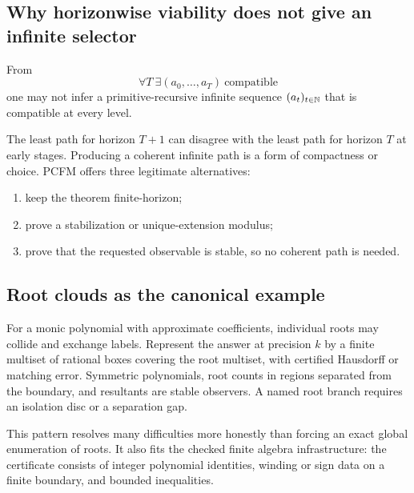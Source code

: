 \subsection{Why horizonwise viability does not give an infinite selector}

\begin{barrier}
From
\[
  \forall T\ \exists (a_0,\ldots,a_T)\ \text{compatible}
\]
one may not infer a primitive-recursive infinite sequence
\((a_t)_{t\in\mathbb{N}}\) that is compatible at every level.
\end{barrier}

The least path for horizon \(T+1\) can disagree with the least path for horizon
\(T\) at early stages.  Producing a coherent infinite path is a form of
compactness or choice.  PCFM offers three legitimate alternatives:

\begin{enumerate}
\item keep the theorem finite-horizon;
\item prove a stabilization or unique-extension modulus;
\item prove that the requested observable is stable, so no coherent path is
needed.
\end{enumerate}

\subsection{Root clouds as the canonical example}

For a monic polynomial with approximate coefficients, individual roots may
collide and exchange labels.  Represent the answer at precision \(k\) by a
finite multiset of rational boxes covering the root multiset, with certified
Hausdorff or matching error.  Symmetric polynomials, root counts in regions
separated from the boundary, and resultants are stable observers.  A named
root branch requires an isolation disc or a separation gap.

This pattern resolves many difficulties more honestly than forcing an exact
global enumeration of roots.  It also fits the checked finite algebra
infrastructure: the certificate consists of integer polynomial identities,
winding or sign data on a finite boundary, and bounded inequalities.
